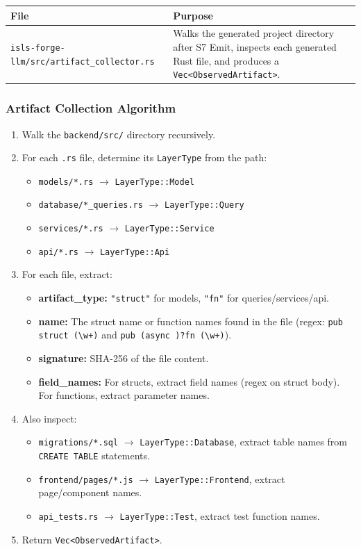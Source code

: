 \documentclass[11pt,a4paper]{article}
\begin{document}
\begin{longtable}{lp{10cm}}
\toprule
\textbf{File} & \textbf{Purpose} \\
\midrule
\texttt{isls-forge-llm/src/artifact\_collector.rs} 
  & Walks the generated project directory after S7 Emit, inspects each 
    generated Rust file, and produces a \texttt{Vec<ObservedArtifact>}. \\
\bottomrule
\end{longtable}

\subsubsection{Artifact Collection Algorithm}

\begin{enumerate}[nosep]
\item Walk the \texttt{backend/src/} directory recursively.
\item For each \texttt{.rs} file, determine its \texttt{LayerType} from 
      the path:
      \begin{itemize}[nosep]
      \item \texttt{models/*.rs} $\to$ \texttt{LayerType::Model}
      \item \texttt{database/*\_queries.rs} $\to$ \texttt{LayerType::Query}
      \item \texttt{services/*.rs} $\to$ \texttt{LayerType::Service}
      \item \texttt{api/*.rs} $\to$ \texttt{LayerType::Api}
      \end{itemize}
\item For each file, extract:
      \begin{itemize}[nosep]
      \item \textbf{artifact\_type:} \texttt{"struct"} for models, 
            \texttt{"fn"} for queries/services/api.
      \item \textbf{name:} The struct name or function names found in 
            the file (regex: \texttt{pub struct (\textbackslash w+)} and 
            \texttt{pub (async )?fn (\textbackslash w+)}).
      \item \textbf{signature:} SHA-256 of the file content.
      \item \textbf{field\_names:} For structs, extract field names 
            (regex on struct body). For functions, extract parameter names.
      \end{itemize}
\item Also inspect:
      \begin{itemize}[nosep]
      \item \texttt{migrations/*.sql} $\to$ \texttt{LayerType::Database}, 
            extract table names from \texttt{CREATE TABLE} statements.
      \item \texttt{frontend/pages/*.js} $\to$ \texttt{LayerType::Frontend}, 
            extract page/component names.
      \item \texttt{api\_tests.rs} $\to$ \texttt{LayerType::Test}, 
            extract test function names.
      \end{itemize}
\item Return \texttt{Vec<ObservedArtifact>}.
\end{enumerate}
\end{document}
